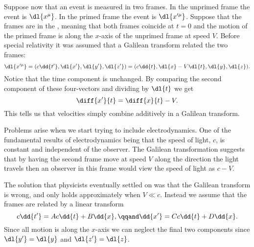 \documentclass[fleqn]{NotesClass}
\begin{document}
    Suppose now that an event is measured in two frames.
    In the unprimed frame the event is \(\dl{x^\mu}\).
    In the primed frame the event is \(\dl{x'^\mu}\).
    Suppose that the frames are in the , meaning that both frames coincide at \(t = 0\) and the motion of the primed frame is along the \(x\)-axis of the unprimed frame at speed \(V\).
    Before special relativity it was assumed that a Galilean transform related the two frames:
    \begin{equation}
        \dl{x'^\mu} = (c\dd{t'}, \dl{x'}, \dl{y'}, \dl{z'}) = (c\dd{t}, \dl{x} - V\dl{t}, \dl{y}, \dl{z}).
    \end{equation}
    Notice that the time component is unchanged.
    By comparing the second component of these four-vectors and dividing by \(\dl{t}\) we get
    \begin{equation}
        \diff{x'}{t} = \diff{x}{t} - V.
    \end{equation}
    This tells us that velocities simply combine additively in a Galilean transform.
    
    Problems arise when we start trying to include electrodynamics.
    One of the fundamental results of electrodynamics being that the speed of light, \(c\), is constant and independent of the observer.
    The Galilean transformation suggests that by having the second frame move at speed \(V\) along the direction the light travels then an observer in this frame would view the speed of light as \(c - V\).
    
    The solution that physicists eventually settled on was that the Galilean transform is wrong, and only holds approximately when \(V \ll c\).
    Instead we assume that the frames are related by a linear transform
    \begin{equation}
        c\dd{t'} = Ac\dd{t} + B\dd{x}, \qqand \dd{x'} = Cc\dd{t} + D\dd{x}.
    \end{equation}
    Since all motion is along the \(x\)-axis we can neglect the final two components since \(\dl{y'} = \dl{y}\) and \(\dl{z'} = \dl{z}\).
    
\end{document}
